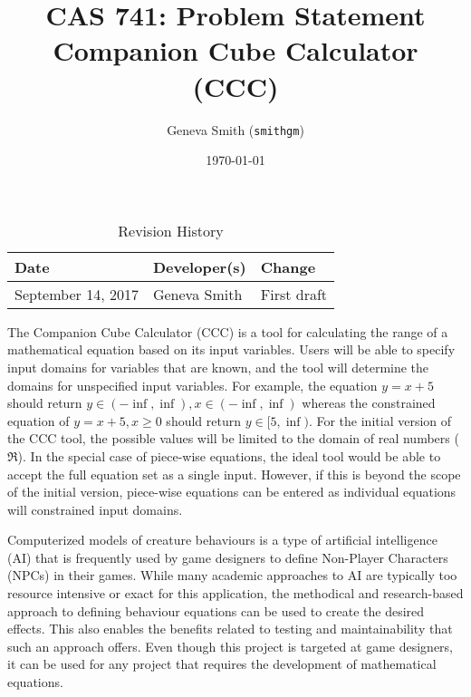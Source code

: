 \documentclass{article}
\title{CAS 741: Problem Statement\\Companion Cube Calculator (CCC)}
\author{Geneva Smith (\texttt{smithgm})}
\date{\today}
\begin{document}
\maketitle

\begin{table}[hp]
\caption{Revision History} \label{TblRevisionHistory}
\begin{tabularx}{\textwidth}{llX}
\toprule
\textbf{Date} & \textbf{Developer(s)} & \textbf{Change}\\
\midrule
September 14, 2017 & Geneva Smith & First draft \\
\bottomrule
\end{tabularx}
\end{table}

The Companion Cube Calculator (CCC) is a tool for calculating the range of a 
mathematical equation based on its input variables. Users will be able to 
specify input domains for variables that are known, and the tool will determine 
the domains for unspecified input variables. For example, the equation $y = x + 
5$ should return $y \in (-\inf, \inf), x \in (-\inf, \inf)$ whereas the 
constrained equation of $y = x + 5, x \geq 0$ should return $y \in 
[5, \inf)$. For the initial version of the CCC tool, the possible values will 
be limited to the domain of real numbers ($\Re$). In the special case of 
piece-wise equations, the ideal tool would be able to accept the full equation 
set as a single input. However, if this is beyond the scope of the initial 
version, piece-wise equations can be entered as individual equations will 
constrained input domains.

Computerized models of creature behaviours is a type of artificial intelligence 
(AI) that is frequently used by game designers to define Non-Player Characters 
(NPCs) in their games. While many academic approaches to AI are typically too 
resource intensive or exact for this application, the methodical and 
research-based approach to defining behaviour equations can be used to create 
the desired effects. This also enables the benefits related to testing and 
maintainability that such an approach offers. Even though this project is 
targeted at game designers, it can be used for any project that requires the 
development of mathematical equations.
\end{document}
